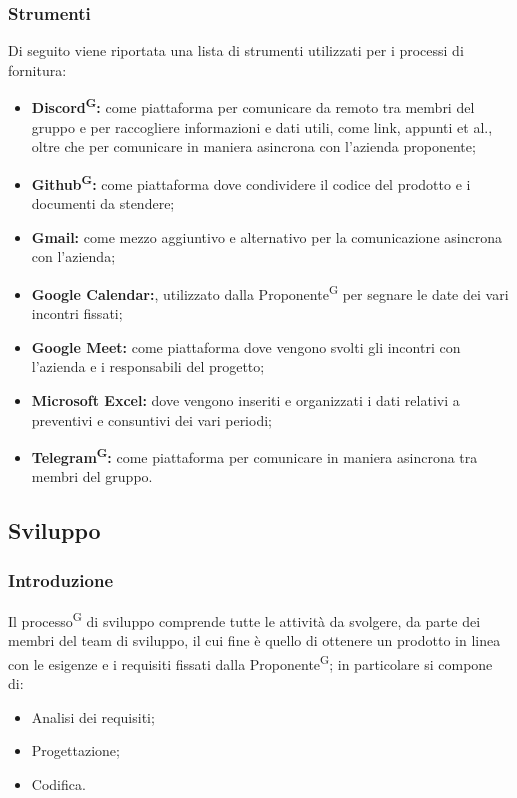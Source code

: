 \documentclass[8pt]{article}
\newcommand{\glossterm}[1]{#1\textsuperscript{G}} %
\begin{document}
\subsubsection{Strumenti}
Di seguito viene riportata una lista di strumenti utilizzati per i processi di fornitura:
\begin{itemize}
    \item \textbf{\glossterm{Discord}:} come piattaforma per comunicare da remoto tra membri del gruppo e per raccogliere informazioni e dati utili, come link, appunti et al., oltre che per comunicare in maniera asincrona con l'azienda proponente;
    \item \textbf{\glossterm{Github}:} come piattaforma dove condividere il codice del prodotto e i documenti da stendere;
    \item \textbf{Gmail:} come mezzo aggiuntivo e alternativo per la comunicazione asincrona con l'azienda;
    \item \textbf{Google Calendar:}, utilizzato dalla \glossterm{Proponente} per segnare le date dei vari incontri fissati;
    \item \textbf{Google Meet:} come piattaforma dove vengono svolti gli incontri con l'azienda e i responsabili del progetto; 
    \item \textbf{Microsoft Excel:} dove vengono inseriti e organizzati i dati relativi a preventivi e consuntivi dei vari periodi; 
    \item \textbf{\glossterm{Telegram}:} come piattaforma per comunicare in maniera asincrona tra membri del gruppo. 
\end{itemize}

\subsection{Sviluppo}

\subsubsection{Introduzione}
Il \glossterm{processo} di sviluppo comprende tutte le attività da svolgere, da parte dei membri del team di sviluppo, il cui fine è quello di ottenere un prodotto in linea con le esigenze e i requisiti fissati dalla \glossterm{Proponente}; in particolare si compone di:
\begin{itemize}
    \item Analisi dei requisiti;
    \item Progettazione;
    \item Codifica.
\end{itemize} 
\end{document}
